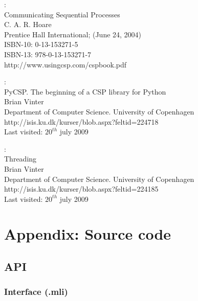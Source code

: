 \documentclass[a4paper,12pt]{article}
\begin{document}
\begin{thebibliography}{99}

:\\
Communicating Sequential Processes\\
C. A. R. Hoare\\
Prentice Hall International; (June 24, 2004)\\
ISBN-10: 0-13-153271-5\\
ISBN-13: 978-0-13-153271-7\\
http://www.usingcsp.com/cspbook.pdf


:\\
PyCSP. The beginning of a CSP library for Python\\
Brian Vinter\\
Department of Computer Science. University of Copenhagen\\
http://isis.ku.dk/kurser/blob.aspx?feltid=224718\\
Last visited: $20^{th}$ july 2009

:\\
Threading\\
Brian Vinter\\
Department of Computer Science. University of Copenhagen\\
http://isis.ku.dk/kurser/blob.aspx?feltid=224185\\
Last visited: $20^{th}$ july 2009



\end{thebibliography}


\appendix
\newpage
\section{Appendix: Source code}
\label{appendixSrc}

\scriptsize
\subsection{API}
\label{appendixAPI}
\subsubsection{Interface (.mli)}

\end{document}
